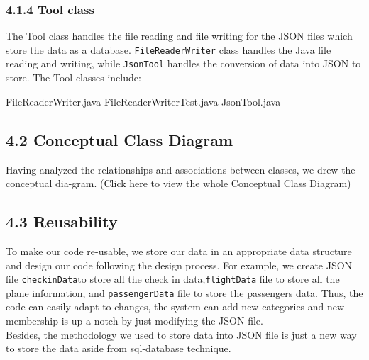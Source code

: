 \documentclass[
]{article}
\newenvironment{Shaded}{}{}
\newcommand{\NormalTok}[1]{#1}
\begin{document}
\hypertarget{414-tool-class}{%
\subsubsection{4.1.4 Tool class}\label{414-tool-class}}

The Tool class handles the file reading and file writing for the JSON
files which store the data as a database. \texttt{FileReaderWriter}
class handles the Java file reading and writing, while \texttt{JsonTool}
handles the conversion of data into JSON to store. The Tool classes
include:

\begin{Shaded}
\begin{Highlighting}[]
\NormalTok{ FileReaderWriter.java}
\NormalTok{ FileReaderWriterTest.java}
\NormalTok{ JsonTool.java}
\end{Highlighting}
\end{Shaded}

\hypertarget{42-conceptual-class-diagram}{%
\subsection{4.2 Conceptual Class
Diagram}\label{42-conceptual-class-diagram}}

Having analyzed the relationships and associations between classes, we
drew the conceptual dia-gram. (Click here to view the whole Conceptual
Class Diagram)

\hypertarget{43-reusability}{%
\subsection{4.3 Reusability}\label{43-reusability}}

To make our code re-usable, we store our data in an appropriate data
structure and design our code following the design process. For example,
we create JSON file \texttt{checkinData}to store all the check in
data,\texttt{flightData} file to store all the plane information, and
\texttt{passengerData} file to store the passengers data. Thus, the code
can easily adapt to changes, the system can add new categories and new
membership is up a notch by just modifying the JSON file.\\
Besides, the methodology we used to store data into JSON file is just a
new way to store the data aside from sql-database technique.
\end{document}
